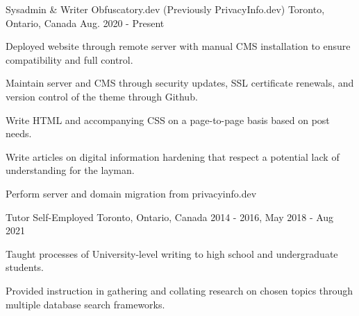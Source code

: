 

\begin{cventries}

  \cventry
    {Sysadmin \& Writer} %
    {Obfuscatory.dev (Previously PrivacyInfo.dev)} %
    {Toronto, Ontario, Canada} %
    {Aug. 2020 - Present} %
    {
      \begin{cvitems} %
        \item {Deployed website through remote server with manual CMS installation to ensure compatibility and full control.}
        \item {Maintain server and CMS through security updates, SSL certificate renewals, and version control of the theme through Github.}
        \item {Write HTML and accompanying CSS on a page-to-page basis based on post needs.}
        \item {Write articles on digital information hardening that respect a potential lack of understanding for the layman.}
        \item {Perform server and domain migration from privacyinfo.dev}
      \end{cvitems}
    }

  \cventry
    {Tutor} %
    {Self-Employed} %
    {Toronto, Ontario, Canada} %
    {2014 - 2016, May 2018 - Aug 2021} %
    {
      \begin{cvitems} %
        \item {Taught processes of University-level writing to high school and undergraduate students.}
        \item {Provided instruction in gathering and collating research on chosen topics through multiple database search frameworks.}
      \end{cvitems}
    }



\end{cventries}
